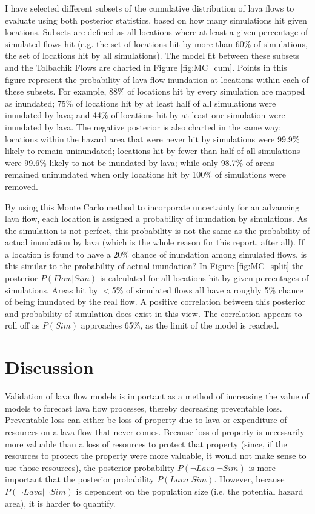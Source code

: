 \documentclass[12pt,letter]{article}
\begin{document}
I have selected different subsets of the cumulative distribution of lava flows to evaluate using both posterior statistics, based on how many simulations hit given locations. Subsets are defined as all locations where at least a given percentage of simulated flows hit (e.g. the set of locations hit by more than 60\% of simulations, the set of locations hit by all simulations). The model fit between these subsets and the Tolbachik Flows are charted in Figure \ref{fig:MC_cum}. Points in this figure represent the probability of lava flow inundation at locations within each of these subsets. For example, 88\% of locations hit by every simulation are mapped as inundated; 75\% of locations hit by at least half of all simulations were inundated by lava; and 44\% of locations hit by at least one simulation were inundated by lava. The negative posterior is also charted in the same way: locations within the hazard area that were never hit by simulations were 99.9\% likely to remain uninundated; locations hit by fewer than half of all simulations were 99.6\% likely to not be inundated by lava; while only 98.7\% of areas remained uninundated when only locations hit by 100\% of simulations were removed.

By using this Monte Carlo method to incorporate uncertainty for an advancing lava flow, each location is assigned a probability of inundation by simulations. As the simulation is not perfect, this probability is not the same as the probability of actual inundation by lava (which is the whole reason for this report, after all). If a location is found to have a 20\% chance of inundation among simulated flows, is this similar to the probability of actual inundation? In Figure \ref{fig:MC_split} the posterior $P(Flow|Sim)$ is calculated for all locations hit by given percentages of simulations. Areas hit by $<$5\% of simulated flows all have a roughly 5\% chance of being inundated by the real flow. A positive correlation between this posterior and probability of simulation does exist in this view. The correlation appears to roll off as $P(Sim)$ approaches 65\%, as the limit of the model is reached.



\section{Discussion}\label{sec:disc}
Validation of lava flow models is important as a method of increasing the value of models to forecast lava flow processes, thereby decreasing preventable loss. Preventable loss can either be loss of property due to lava or expenditure of resources on a lava flow that never comes. Because loss of property is necessarily more valuable than a loss of resources to protect that property (since, if the resources to protect the property were more valuable, it would not make sense to use those resources), the posterior probability $P(\neg Lava|\neg Sim)$ is more important that the posterior probability $P(Lava|Sim)$. However, because $P(\neg Lava|\neg Sim)$ is dependent on the population size (i.e. the potential hazard area), it is harder to quantify.
\end{document}
